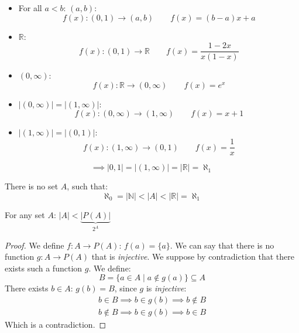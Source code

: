 \documentclass[00_complete]{subfiles}
\begin{document}
\begin{itemize} \tightlist
    \item For all $a<b$: $(a,b)$:
    $$f(x):(0,1)\to (a,b) \qquad f(x)=(b-a)x+a$$
    \item $\mathbb{R}$:
    $$f(x):(0,1)\to \mathbb{R} \qquad f(x)=\frac{1-2x}{x(1-x)}$$
    \item $(0, \infty)$:
    $$f(x):\mathbb{R}\to (0,\infty) \qquad f(x)=e^x$$
    \item $|(0,\infty)|=|(1,\infty)|$:
    $$f(x):(0,\infty)\to (1,\infty) \qquad f(x)=x+1$$
    \item $|(1,\infty)|=|(0,1)|$:
    $$f(x):(1,\infty)\to (0,1) \qquad f(x)=\frac{1}{x}$$
\end{itemize}
$$\implies |0,1| = |(1,\infty)|=|\mathbb{R}| = \aleph_1$$
\begin{claim}
    There is no set $A$, such that:
    $$\aleph_0 =|\mathbb{N}|<|A|<|\mathbb{R}|=\aleph_1$$
\end{claim}
\begin{theorem}
    For any set $A$: $|A|<\underbrace{|P(A)|}_{2^A}$
\end{theorem}
\begin{proof}
    We define $f:A \to P(A)$: $f(a)=\{a\}$. We can say that there is no
    function $g: A \to P(A)$ that is \emph{injective}. We suppose by
    contradiction that there exists such a function $g$. We define:
    $$B=\{a \in A \mid a \notin g(a)\} \subseteq A$$
    There exists $b \in A$: $g(b)=B$, since $g$ is \emph{injective}:
    \begin{gather*}
        b \in B \implies b \in g(b) \implies b \notin B \\
        b \notin B \implies b \in g(b) \implies b \in B
    \end{gather*}
    Which is a contradiction.
\end{proof}
\end{document}
